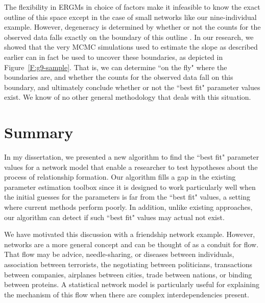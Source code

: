 \documentclass[12pt]{article}
\begin{document}
The flexibility in ERGMs in choice of factors make it 
infeasible to know the exact outline of this space except in the case of small networks 
like our nine-individual example.  However, degeneracy is determined by whether or not
the counts for the observed data falls exactly on the boundary of this outline \citep{Handcock:degeneracy,Rinaldo:2009,Geyer:gdor}.
In our research, we showed that the very MCMC simulations used to estimate the 
slope as described earlier can in fact be used to uncover these boundaries, as
depicted in Figure~\ref{F:g9-sample}.  That is, we can determine ``on the fly"
where the boundaries are, and whether the counts for the observed data fall on this boundary,
and ultimately conclude whether or not the ``best fit" parameter values exist.
We know of no other general methodology that deals with this situation.

\section{Summary}
In my dissertation, we presented a new algorithm to find the ``best fit" parameter values for a
network model that enable a researcher to test hypotheses about the 
process of relationship formation.
Our algorithm fills a gap in the existing parameter estimation toolbox since it is designed to
work particularly well when the initial guesses for the parameters is far from the 
``best fit" values, a setting where current methods perform poorly.  
In addition, unlike existing approaches, our algorithm can
detect if such ``best fit" values may actual not exist.

We have motivated this discussion with a friendship network example.  However, networks are
a more general concept and can be thought of as a conduit for flow.  That flow
may be advice, needle-sharing, or diseases between individuals, association between
terrorists, the negotiating between politicians,
transactions between companies,
airplanes between cities,
trade between nations,
or binding between proteins.
A statistical network model is particularly useful for explaining the mechanism of this flow
when there are complex interdependencies present.

\end{document}

